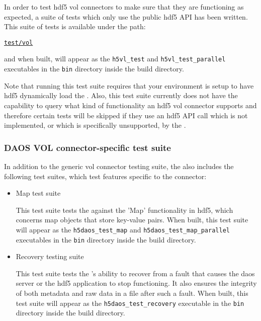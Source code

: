\documentclass[../users_guide.tex]{subfiles}
\begin{document}
In order to test \acrshort{hdf5} \acrshort{vol} \glspl{connector} to make sure that they are functioning as expected, a suite of tests which only use the public \acrshort{hdf5} API has been written. This suite of tests is available under the path:

\href{https://bitbucket.hdfgroup.org/projects/HDF5VOL/repos/daos-vol/browse/test}{\texttt{test/vol}}

and when built, will appear as the \texttt{h5vl\_test} and \texttt{h5vl\_test\_parallel} executables in the \texttt{bin} directory inside the build directory.

Note that running this test suite requires that your environment is setup to have \acrshort{hdf5} dynamically load the \dvc{}. Also, this test suite currently does not have the capability to query what kind of functionality an \acrshort{hdf5} \acrshort{vol} \gls{connector} supports and therefore certain tests will be skipped if they use an \acrshort{hdf5} API call which is not implemented, or which is specifically unsupported, by the \dvc.

\subsubsection{DAOS VOL connector-specific test suite}

In addition to the generic \acrshort{vol} \gls{connector} testing suite, the \dvc{} also includes the following test suites, which test features specific to the \gls{connector}:

\begin{itemize}
    \item \dvc{} Map test suite

    This test suite tests the \dvc{} against the 'Map' functionality in \acrshort{hdf5}, which concerns map objects that store key-value pairs. When built, this test suite will appear as the \texttt{h5daos\_test\_map} and \texttt{h5daos\_test\_map\_parallel} executables in the \texttt{bin} directory inside the build directory.

    \item \dvc{} Recovery testing suite

    This test suite tests the \dvc's ability to recover from a fault that causes the \acrshort{daos} server or the \acrshort{hdf5} application to stop functioning. It also ensures the integrity of both metadata and raw data in a file after such a fault. When built, this test suite will appear as the \texttt{h5daos\_test\_recovery} executable in the \texttt{bin} directory inside the build directory.
\end{itemize}
\end{document}

